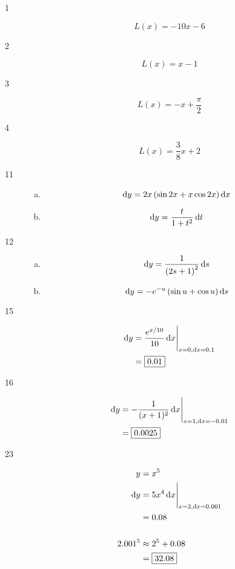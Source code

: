 \documentclass[letterpaper, landscape]{exam}
\newcommand{\dx}{\dif x}
\newcommand{\dy}{\dif y}
\begin{document}
  \begin{description}
    \item[1] 
      \[
        L(x) = -10x - 6
      \]

    \item[2] 
      \[
        L(x) = x - 1
      \]

    \item[3] 
      \[
        L(x) = -x + \frac{\pi}{2} 
      \]

    \item[4] 
      \[
        L(x) = \frac{3}{8} x + 2
      \]

    \item[11]
      \begin{enumerate}[(a)]
        \item 
          \[
            \dy = 2x \del{ \sin 2x + x \cos 2x } \dx
          \]

        \item
          \[
            \dy = \frac{t}{1 + t^2} \dif t
          \]

      \end{enumerate}

    \item[12]
      \begin{enumerate}[(a)]
        \item 
          \[
            \dy = \frac{1}{\del{2s + 1}^2} \dif s
          \]

        \item
          \[
            \dy = - e^{-u} \del{\sin u + \cos u} \dif s
          \]

      \end{enumerate}

    \item[15]
      \begin{align*}
        \dy & = \eval{ \frac{e^{x/10}}{10} \dx }_{x = 0, \dx = 0.1} \\
            & = \boxed{ 0.01 } \\
      \end{align*}

    \item[16]
      \begin{align*}
        \dy & = \eval{ -\frac{1}{(x+1)^2} \dx }_{x = 1, \dx = -0.01} \\
            & = \boxed{ 0.0025 } \\
      \end{align*}

    \item[23]
      \begin{align*}
        y       & = x^5 \\
        \dy     & =  \eval{ 5x^4 \dx }_{x = 2, \dx = 0.001} \\
                & = 0.08 \\
        \\
        2.001^5 & \approx 2^5 + 0.08 \\
                & = \boxed{ 32.08 } \\
      \end{align*}


\end{description}
\end{document}
